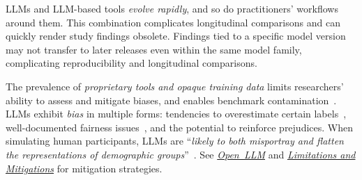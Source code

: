 \documentclass[smallextended]{svjour3}
\newcommand*{\enq}[1]{\enquote{{\itshape#1}}}
\newcommand{\openllm}{\hyperref[sec:use-an-open-llm-as-a-baseline]{\mbox{\emph{Open LLM}}}\xspace}
\newcommand{\limitationsmitigations}{\hyperref[sec:report-limitations-and-mitigations]{\emph{Limitations and Mitigations}}\xspace}
\newcommand{\openllm}{\href{/guidelines/open-llm/}{\emph{Open LLM}}\xspace}
\newcommand{\limitationsmitigations}{\href{/guidelines/limitations/}{\emph{Limitations and Mitigations}}\xspace}
\begin{document}
LLMs and LLM-based tools \emph{evolve rapidly}, and so do practitioners' workflows around them. This combination complicates longitudinal comparisons and can quickly render study findings obsolete.
Findings tied to a specific model version may not transfer to later releases even within the same model family, complicating reproducibility and longitudinal comparisons.

The prevalence of \emph{proprietary tools and opaque training data} limits researchers' ability to assess and mitigate biases, and enables benchmark contamination~\cite{DBLP:journals/corr/abs-2410-16186}. LLMs exhibit \emph{bias} in multiple forms: tendencies to overestimate certain labels~\cite{DBLP:journals/corr/abs-2304-10145}, well-documented fairness issues~\cite{DBLP:journals/coling/GallegosRBTKDYZA24}, and the potential to reinforce prejudices. When simulating human participants, LLMs are \enq{likely to both misportray and flatten the representations of demographic groups}~\cite{DBLP:journals/natmi/WangMD25}. See \openllm and \limitationsmitigations for mitigation strategies.
\end{document}

